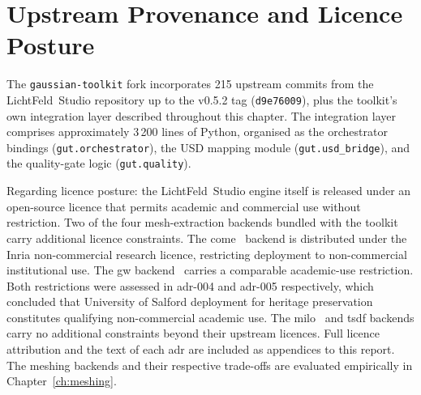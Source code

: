 \section{Upstream Provenance and Licence Posture}
\label{sec:lf-provenance}

The \texttt{gaussian-toolkit} fork incorporates 215 upstream commits from the LichtFeld~Studio
repository up to the v0.5.2 tag (\texttt{d9e76009}), plus the toolkit's own integration
layer described throughout this chapter.
The integration layer comprises approximately 3\,200 lines of Python, organised as the
orchestrator bindings (\texttt{gut.orchestrator}), the USD mapping module
(\texttt{gut.usd\_bridge}), and the quality-gate logic (\texttt{gut.quality}).

Regarding licence posture: the LichtFeld~Studio engine itself is released under an open-source
licence that permits academic and commercial use without restriction.
Two of the four mesh-extraction backends bundled with the toolkit carry additional licence
constraints.
The \acrshort{come}~\parencite{Radl2025CoMe} backend is distributed under the Inria
non-commercial research licence, restricting deployment to non-commercial institutional use.
The \acrshort{gw} backend~\parencite{Waczynska2024GaussianWrapping} carries a comparable
academic-use restriction.
Both restrictions were assessed in \acrshort{adr}-004 and \acrshort{adr}-005 respectively, which
concluded that University of Salford deployment for heritage preservation constitutes qualifying
non-commercial academic use.
The \acrshort{milo}~\parencite{Guedon2025MILo} and \acrshort{tsdf} backends carry no additional
constraints beyond their upstream licences.
Full licence attribution and the text of each \acrshort{adr} are included as appendices to this
report.
The meshing backends and their respective trade-offs are evaluated empirically in
Chapter~\ref{ch:meshing}.
